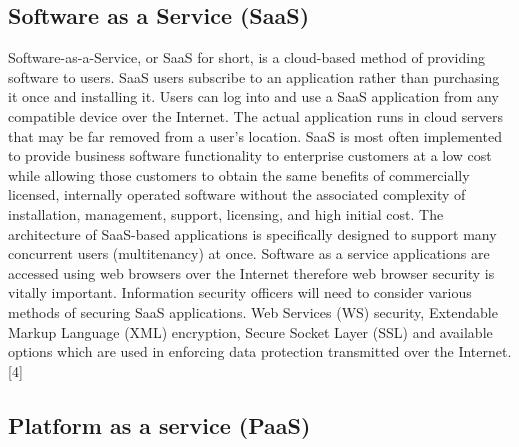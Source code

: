\documentclass[conference]{IEEEtran}
\begin{document}
\subsection{Software as a Service (SaaS)}
Software-as-a-Service, or SaaS for short, is a cloud-based method of providing software to users. SaaS users subscribe to an application rather than purchasing it once and installing it. Users can log into and use a SaaS application from any compatible device over the Internet. The actual application runs in cloud servers that may be far removed from a user's location. SaaS is most often implemented to provide business software functionality to enterprise customers at a low cost while allowing those customers to obtain the same benefits of commercially licensed, internally operated software without the associated complexity of installation, management, support, licensing, and high initial cost. The architecture of SaaS-based applications is specifically designed to support many concurrent users (multitenancy) at once. Software as a service applications are accessed using web browsers over the Internet therefore web browser security is vitally important. Information security officers will need to consider various methods of securing SaaS applications. Web Services (WS) security, Extendable Markup Language (XML) encryption, Secure Socket Layer (SSL) and available options which are used in enforcing data protection transmitted over the Internet.[4]
\subsection{Platform as a service (PaaS)}
\end{document}
